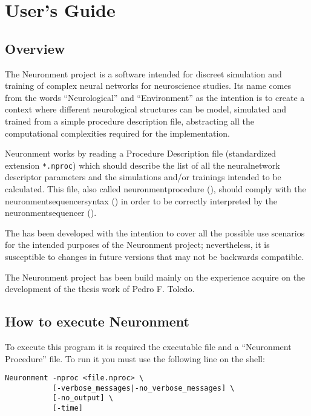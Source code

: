 \chapter{User's Guide}
\label{ch:usersguide}

\section{Overview}

The Neuronment project is a software intended for discreet simulation and training of complex neural networks for neuroscience studies. Its name comes from the words ``Neurological'' and ``Environment'' as the intention is to create a context where different neurological structures can be model, simulated and trained from a simple procedure description file, abstracting all the computational complexities required for the implementation.

Neuronment works by reading a Procedure Description file (standardized extension \texttt{*.nproc}) which should describe the list of all the \gls{neuralnetwork} descriptor parameters and the simulations and/or trainings intended to be calculated. This file, also called  \gls{neuronmentprocedure} (), should comply with the \gls{neuronmentsequencersyntax} () in order to be correctly interpreted by the \gls{neuronmentsequencer} ().

The  has been developed with the intention to cover all the possible use scenarios for the intended purposes of the Neuronment project; nevertheless, it is susceptible to changes in future versions that may not be backwards compatible.

The Neuronment project has been build mainly on the experience acquire on the development of the thesis work of Pedro F. Toledo\cite{thesispedro}.

\section{How to execute Neuronment}

To execute this program it is required the executable file and a ``Neuronment Procedure'' file. To run it you must use the following line on the shell:

\begin{verbatim}
Neuronment -nproc <file.nproc> \
           [-verbose_messages|-no_verbose_messages] \
           [-no_output] \
           [-time]
\end{verbatim}

